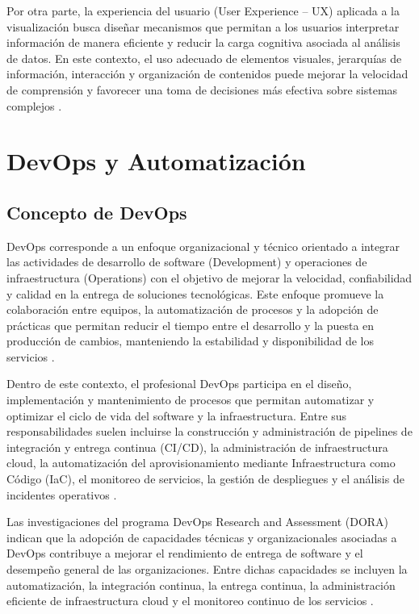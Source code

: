 Por otra parte, la experiencia del usuario (User Experience -- UX) aplicada a la visualización busca diseñar mecanismos que permitan a los usuarios interpretar información de manera eficiente y reducir la carga cognitiva asociada al análisis de datos. En este contexto, el uso adecuado de elementos visuales, jerarquías de información, interacción y organización de contenidos puede mejorar la velocidad de comprensión y favorecer una toma de decisiones más efectiva sobre sistemas complejos \parencite{Shneiderman1996}.

\section{DevOps y Automatización}

\subsection{Concepto de DevOps}

DevOps corresponde a un enfoque organizacional y técnico orientado a integrar las actividades de desarrollo de software (Development) y operaciones de infraestructura (Operations) con el objetivo de mejorar la velocidad, confiabilidad y calidad en la entrega de soluciones tecnológicas. Este enfoque promueve la colaboración entre equipos, la automatización de procesos y la adopción de prácticas que permitan reducir el tiempo entre el desarrollo y la puesta en producción de cambios, manteniendo la estabilidad y disponibilidad de los servicios \parencite{GoogleCloud2026}.

Dentro de este contexto, el profesional DevOps participa en el diseño, implementación y mantenimiento de procesos que permitan automatizar y optimizar el ciclo de vida del software y la infraestructura. Entre sus responsabilidades suelen incluirse la construcción y administración de pipelines de integración y entrega continua (CI/CD), la administración de infraestructura cloud, la automatización del aprovisionamiento mediante Infraestructura como Código (IaC), el monitoreo de servicios, la gestión de despliegues y el análisis de incidentes operativos \parencite{GoogleCloud2026}.

Las investigaciones del programa DevOps Research and Assessment (DORA) indican que la adopción de capacidades técnicas y organizacionales asociadas a DevOps contribuye a mejorar el rendimiento de entrega de software y el desempeño general de las organizaciones. Entre dichas capacidades se incluyen la automatización, la integración continua, la entrega continua, la administración eficiente de infraestructura cloud y el monitoreo continuo de los servicios \parencite{GoogleCloud2026}.

